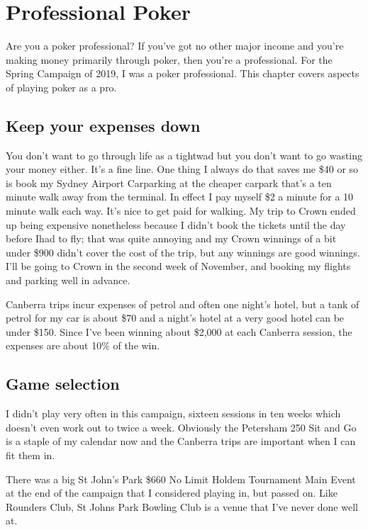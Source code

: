 \chapter{Professional Poker}

Are you a poker professional? If you've got no other major income and
you're making money primarily through poker, then you're a
professional. For the Spring Campaign of 2019, I was a poker
professional. This chapter covers aspects of playing poker as a pro.

\section*{Keep your expenses down}

You don't want to go through life as a tightwad but you don't want to
go wasting your money either. It's a fine line. One thing I always do
that saves me \$40 or so is book my Sydney Airport Carparking at the
cheaper carpark that's a ten minute walk away from the
terminal. In effect I pay myself \$2 a minute for a 10 minute walk
each way. It's nice to get paid for walking. My trip to Crown ended up
being expensive nonetheless because I didn't book the tickets until
the day before Ihad to fly; that was quite annoying and my Crown
winnings of a bit under \$900 didn't cover the cost of the trip, but
any winnings are good winnings. I'll be going to Crown in the second
week of November, and booking my flights and parking well in advance.

Canberra trips incur expenses of petrol and often one night's hotel,
but a tank of petrol for my car is about \$70 and a night's hotel at
a very good hotel can be under \$150. Since I've been winning about
\$2,000 at each Canberra session, the expenses are about 10\% of
the win.

\section*{Game selection}

I didn't play very often in this campaign, sixteen sessions in ten
weeks which doesn't even work out to twice a week. Obviously the
Petersham 250 Sit and Go is a staple of my calendar now and the
Canberra trips are important when I can fit them in.

There was a big St John's Park \$660 No Limit Holdem Tournament Main
Event at the end of the campaign that I considered playing in, but
passed on. Like Rounders Club, St Johns Park Bowling Club is
a venue that I've never done well at.

